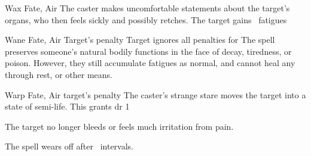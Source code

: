   {}%
  {Wax}%
  {Fate, Air}%
  {}%
  {The caster makes uncomfortable statements about the target's organs, who then feels sickly and possibly retches.
  The target gains ~\glspl{fatigue}}%
  {}

  {}%
  {Wane}%
  {Fate, Air}%
  {Target's  penalty}%
  {Target ignores all  penalties for }%
  {The spell preserves someone's natural bodily functions in the face of decay, tiredness, or poison.
    However, they still accumulate \glspl{fatigue} as normal, and cannot heal any through rest, or other means.}

  {}%
  {Warp}%
  {Fate, Air}%
  {target's  penalty}%
  {The caster's strange stare moves the target into a state of semi-life.
  This grants \gls{dr} 1}%
  {
    The target no longer bleeds or feels much irritation from pain.%

    The spell wears off after ~\glspl{interval}.}


